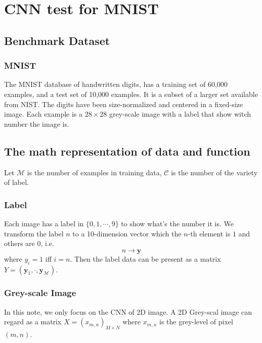 	
\chapter{CNN test for MNIST}	
	
	\section{Benchmark Dataset}
	\subsection{MNIST}
	The MNIST database of handwritten digits, has a training set of 60,000 examples, and a test set of 10,000 examples. It is a subset of a larger set available from NIST. The digits have been size-normalized and centered in a fixed-size image. Each example is a $28\times 28$ grey-scale image with a label that show witch number the image is.




	\section{The math representation of data and function}
	Let $\mathcal{M}$ is the number of examples in training data, $\mathcal{C}$ is the number of the variety of label.
	
	\subsection{Label} Each image has a label in $\{0,1,\cdots,9\}$ to show what's the number it is. We transform the label $n$ to a 10-dimension vector which the $n$-th element is $1$ and others are $0$, i.e. 
	$$
	n \rightarrow \mathbf y
	$$
	where $y_i = 1 $ iff $i=n$.
	Then the label data can be present as a matrix $Y = (\mathbf y_1,\cdot,\mathbf{y}_{\mathcal M})$.
	\subsection{Grey-scale Image}
	In this note, we only focus on the CNN of 2D image. A 2D Grey-scal image can regard as a matrix $X =(x_{m,n})_{M\times N}$ where $x_{m,n}$ is the grey-level of pixel $(m,n)$.
